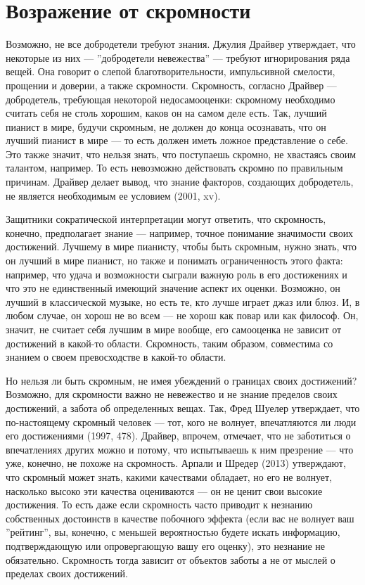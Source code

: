 \documentclass[11pt]{book}
\begin{document}
\section{Возражение от скромности}

Возможно, не все добродетели требуют знания. Джулия Драйвер утверждает, что некоторые из них --- ''добродетели невежества'' --- требуют игнорирования ряда вещей. Она говорит о слепой благотворительности, импульсивной смелости, прощении и доверии, а также скромности. Скромность, согласно Драйвер --- добродетель, требующая некоторой недосамооценки: скромному необходимо считать себя не столь хорошим, каков он на самом деле есть. Так, лучший пианист в мире, будучи скромным, не должен до конца осознавать, что он лучший пианист в мире --- то есть должен иметь ложное представление о себе. Это также значит, что нельзя знать, что поступаешь скромно, не хвастаясь своим талантом, например. То есть невозможно действовать скромно по правильным причинам. Драйвер делает вывод, что знание факторов, создающих добродетель, не является необходимым ее условием (2001, xv).

Защитники сократической интерпретации могут ответить, что скромность, конечно, предполагает знание --- например, точное понимание значимости своих достижений. Лучшему в мире пианисту, чтобы быть скромным, нужно знать, что он лучший в мире пианист, но также и понимать ограниченность этого факта: например, что удача и возможности сыграли важную роль в его достижениях и что это не единственный имеющий значение аспект их оценки. Возможно, он лучший в классической музыке, но есть те, кто лучше играет джаз или блюз. И, в любом случае, он хорош не во всем --- не хорош как повар или как философ. Он, значит, не считает себя лучшим в мире вообще, его самооценка не зависит от достижений в какой-то области. Скромность, таким образом, совместима со знанием о своем превосходстве в какой-то области.

Но нельзя ли быть скромным, не имея убеждений о границах своих достижений? Возможно, для скромности важно не невежество и не знание пределов своих достижений, а забота об определенных вещах. Так, Фред Шуелер утверждает, что по-настоящему скромный человек --- тот, кого не волнует, впечатляются ли люди его достижениями (1997, 478). Драйвер, впрочем, отмечает, что не заботиться о впечатлениях других можно и потому, что испытываешь к ним презрение --- что уже, конечно, не похоже на скромность. Арпали и Шредер (2013) утверждают, что скромный может знать, какими качествами обладает, но его не волнует, насколько высоко эти качества оцениваются --- он не ценит свои высокие достижения. То есть даже если скромность часто приводит к незнанию собственных достоинств в качестве побочного эффекта (если вас не волнует ваш ''рейтинг'', вы, конечно, с меньшей вероятностью будете искать информацию, подтверждающую или опровергающую вашу его оценку), это незнание не обязательно. Скромность тогда зависит от объектов заботы а не от мыслей о пределах своих достижений.
\end{document}

